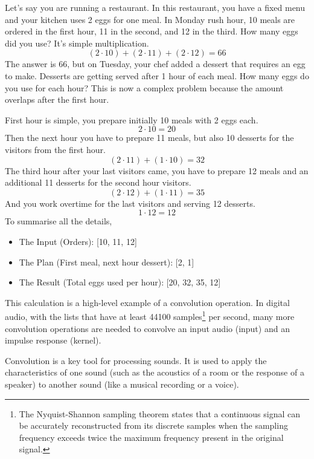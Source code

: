            Let's say you are running a restaurant. In this restaurant, you have a fixed menu and your kitchen uses 2 eggs for one meal. In Monday rush hour, 10 meals are ordered in the first hour, 11 in the second, and 12 in the third. How many eggs did you use? It's simple multiplication. 
            $$(2\cdot10)+(2\cdot11)+(2\cdot12)=66$$
            The answer is 66, but on Tuesday, your chef added a dessert that requires an egg to make. Desserts are getting served after 1 hour of each meal. How many eggs do you use for each hour? This is now a complex problem because the amount overlaps after the first hour.

            First hour is simple, you prepare initially 10 meals with 2 eggs each. 
            $$2\cdot10=20$$
            Then the next hour you have to prepare 11 meals, but also 10 desserts for the visitors from the first hour.
            $$(2\cdot11)+(1\cdot10)=32$$
            The third hour after your last visitors came, you have to prepare 12 meals and an additional 11 desserts for the second hour visitors.
            $$(2\cdot12)+(1\cdot11)=35$$
            And you work overtime for the last visitors and serving 12 desserts.
            $$1\cdot12=12$$
            To summarise all the details,\par
            \begin{itemize}
                \item The Input (Orders): [10, 11, 12]
                \item The Plan (First meal, next hour dessert): [2, 1]
                \item The Result (Total eggs used per hour): [20, 32, 35, 12]
            \end{itemize}
            This calculation is a high-level example of a convolution operation. In digital audio, with the lists that have at least 44100 samples\footnote{The Nyquist-Shannon sampling theorem states that a continuous signal can be accurately reconstructed from its discrete samples when the sampling frequency exceeds twice the maximum frequency present in the original signal\cite{Digital_Audio_Theory}.} per second, many more convolution operations are needed to convolve an input audio (input) and an impulse response (kernel).\par

            Convolution is a key tool for processing sounds. It is used to apply the characteristics of one sound (such as the acoustics of a room or the response of a speaker) to another sound (like a musical recording or a voice).\par

